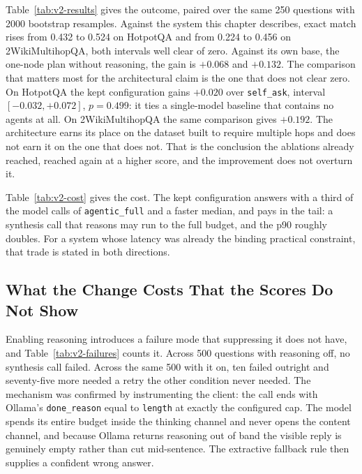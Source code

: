 

Table~\ref{tab:v2-results} gives the outcome, paired over the same 250
questions with 2000 bootstrap resamples. Against the system this chapter
describes, exact match rises from 0.432 to 0.524 on HotpotQA and from 0.224 to
0.456 on 2WikiMultihopQA, both intervals well clear of zero. Against its own
base, the one-node plan without reasoning, the gain is $+0.068$ and $+0.132$.
The comparison that matters most for the architectural claim is the one that
does not clear zero. On HotpotQA the kept configuration gains $+0.020$ over
\texttt{self\_ask}, interval $[-0.032, +0.072]$, $p = 0.499$: it ties a
single-model baseline that contains no agents at all. On 2WikiMultihopQA the
same comparison gives $+0.192$. The architecture earns its place on the
dataset built to require multiple hops and does not earn it on the one that
does not. That is the conclusion the ablations already reached, reached again
at a higher score, and the improvement does not overturn it.



Table~\ref{tab:v2-cost} gives the cost. The kept configuration answers with a
third of the model calls of \texttt{agentic\_full} and a faster median, and
pays in the tail: a synthesis call that reasons may run to the full budget, and
the p90 roughly doubles. For a system whose latency was already the binding
practical constraint, that trade is stated in both directions.

\subsection{What the Change Costs That the Scores Do Not Show}



Enabling reasoning introduces a failure mode that suppressing it does not
have, and Table~\ref{tab:v2-failures} counts it. Across 500 questions with
reasoning off, no synthesis call failed. Across the same 500 with it on, ten
failed outright and seventy-five more needed a retry the other condition never
needed. The mechanism was confirmed by instrumenting the client: the call ends
with Ollama's \texttt{done\_reason} equal to \texttt{length} at exactly the
configured cap. The model spends its entire budget inside the thinking channel
and never opens the content channel, and because Ollama returns reasoning out
of band the visible reply is genuinely empty rather than cut mid-sentence. The
extractive fallback rule then supplies a confident wrong answer.

